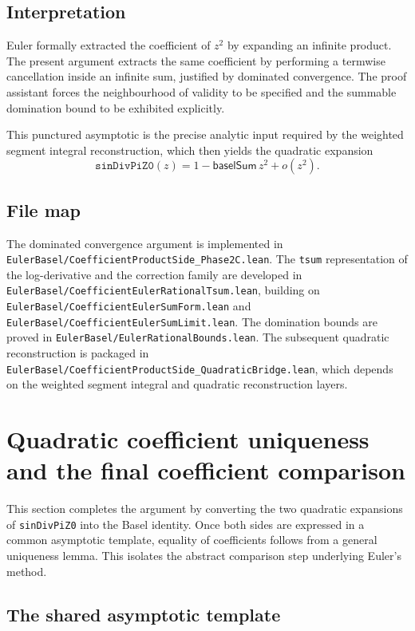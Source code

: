 \documentclass[11pt,a4paper]{article}
\theoremstyle{plain}
\theoremstyle{definition}
\DeclareRobustCommand{\codepath}[1]{\nolinkurl{#1}}
\DeclareRobustCommand{\leanid}[1]{\texttt{#1}}
\DeclareRobustCommand{\codepath}[1]{\nolinkurl{#1}}
\newcommand{\baselSum}{\ensuremath{\mathsf{baselSum}}}
\newcommand{\sinDivPiZZero}{\leanid{sinDivPiZ0}}
\begin{document}
\subsection{Interpretation}

Euler formally extracted the coefficient of \(z^{2}\) by expanding an infinite product. The present argument extracts the same coefficient by performing a termwise cancellation inside an infinite sum, justified by dominated convergence. The proof assistant forces the neighbourhood of validity to be specified and the summable domination bound to be exhibited explicitly.

This punctured asymptotic is the precise analytic input required by the weighted segment integral reconstruction, which then yields the quadratic expansion
\[
\sinDivPiZZero(z)
=
1
-
\baselSum\, z^{2}
+
o(z^{2}).
\]

\subsection{File map}

The dominated convergence argument is implemented in
\codepath{EulerBasel/CoefficientProductSide_Phase2C.lean}.  
The \texttt{tsum} representation of the log-derivative and the correction family are developed in
\codepath{EulerBasel/CoefficientEulerRationalTsum.lean}, building on
\codepath{EulerBasel/CoefficientEulerSumForm.lean} and
\codepath{EulerBasel/CoefficientEulerSumLimit.lean}.  
The domination bounds are proved in \codepath{EulerBasel/EulerRationalBounds.lean}.  
The subsequent quadratic reconstruction is packaged in
\codepath{EulerBasel/CoefficientProductSide_QuadraticBridge.lean},
which depends on the weighted segment integral and quadratic reconstruction layers.

\section{Quadratic coefficient uniqueness and the final coefficient comparison}

This section completes the argument by converting the two quadratic expansions of \sinDivPiZZero{} into the Basel identity. Once both sides are expressed in a common asymptotic template, equality of coefficients follows from a general uniqueness lemma. This isolates the abstract comparison step underlying Euler’s method.

\subsection{The shared asymptotic template}
\end{document}
